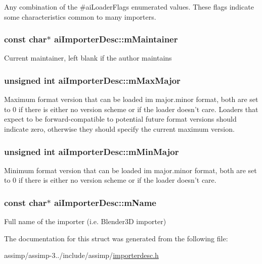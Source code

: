 Any combination of the \#ai\+Loader\+Flags enumerated values. These flags indicate some characteristics common to many importers. \hypertarget{structai_importer_desc_a53bf0ecb36ce0b97018b4b6bd2748f02}{
\subsubsection[{m\+Maintainer}]{\setlength{\rightskip}{0pt plus 5cm}const char$\ast$ ai\+Importer\+Desc\+::m\+Maintainer}}\label{structai_importer_desc_a53bf0ecb36ce0b97018b4b6bd2748f02}
Current maintainer, left blank if the author maintains \hypertarget{structai_importer_desc_a9d33eac3be20f7f4630f838a228ada63}{
\subsubsection[{m\+Max\+Major}]{\setlength{\rightskip}{0pt plus 5cm}unsigned int ai\+Importer\+Desc\+::m\+Max\+Major}}\label{structai_importer_desc_a9d33eac3be20f7f4630f838a228ada63}
Maximum format version that can be loaded im major.\+minor format, both are set to 0 if there is either no version scheme or if the loader doesn't care. Loaders that expect to be forward-\/compatible to potential future format versions should indicate zero, otherwise they should specify the current maximum version. \hypertarget{structai_importer_desc_aee34d348f522807f0a36607664e92a57}{
\subsubsection[{m\+Min\+Major}]{\setlength{\rightskip}{0pt plus 5cm}unsigned int ai\+Importer\+Desc\+::m\+Min\+Major}}\label{structai_importer_desc_aee34d348f522807f0a36607664e92a57}
Minimum format version that can be loaded im major.\+minor format, both are set to 0 if there is either no version scheme or if the loader doesn't care. \hypertarget{structai_importer_desc_a2a9d5fd818c01bba1a0a782722ab9495}{
\subsubsection[{m\+Name}]{\setlength{\rightskip}{0pt plus 5cm}const char$\ast$ ai\+Importer\+Desc\+::m\+Name}}\label{structai_importer_desc_a2a9d5fd818c01bba1a0a782722ab9495}
Full name of the importer (i.\+e. Blender3\+D importer) 

The documentation for this struct was generated from the following file\+:\begin{DoxyCompactItemize}
\item 
assimp/assimp-\/3../include/assimp/\hyperlink{importerdesc_8h}{importerdesc.\+h}\end{DoxyCompactItemize}

